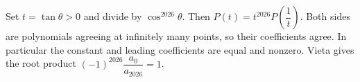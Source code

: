 Set $t=\tan\theta>0$ and divide by $\cos^{2026}\theta$. Then $P (t) = t^{2026} P (\dfrac{1}{t})$. Both sides are polynomials agreeing at infinitely many points, so their coefficients agree. In particular the constant and leading coefficients are equal and nonzero. Vieta gives the root product $(-1)^{2026}\dfrac{a_0}{a_{2026}}=\boxed1$.
